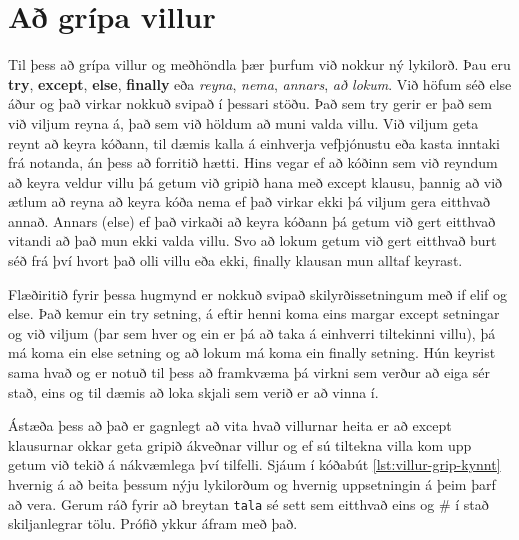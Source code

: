 \section{Að grípa villur}\label{uk:villur-grípa}
Til þess að grípa villur og meðhöndla þær þurfum við nokkur ný lykilorð.
Þau eru \textbf{try}, \textbf{except}, \textbf{else}, \textbf{finally} eða \textit{reyna}, \textit{nema}, \textit{annars}, \textit{að lokum}.
Við höfum séð else áður og það virkar nokkuð svipað í þessari stöðu.
Það sem try gerir er það sem við viljum reyna á, það sem við höldum að muni valda villu.
Við viljum geta reynt að keyra kóðann, til dæmis kalla á einhverja vefþjónustu eða kasta inntaki frá notanda, án þess að forritið hætti.
Hins vegar ef að kóðinn sem við reyndum að keyra veldur villu þá getum við gripið hana með except klausu, þannig að við ætlum að reyna að keyra kóða nema ef það virkar ekki þá viljum gera eitthvað annað.
Annars (else) ef það virkaði að keyra kóðann þá getum við gert eitthvað vitandi að það mun ekki valda villu.
Svo að lokum getum við gert eitthvað burt séð frá því hvort það olli villu eða ekki, finally klausan mun alltaf keyrast.

Flæðiritið fyrir þessa hugmynd er nokkuð svipað skilyrðissetningum með if elif og else.
Það kemur ein try setning, á eftir henni koma eins margar except setningar og við viljum (þar sem hver og ein er þá að taka á einhverri tiltekinni villu), þá má koma ein else setning og að lokum má koma ein finally setning.
Hún keyrist sama hvað og er notuð til þess að framkvæma þá virkni sem verður að eiga sér stað, eins og til dæmis að loka skjali sem verið er að vinna í.

Ástæða þess að það er gagnlegt að vita hvað villurnar heita er að except klausurnar okkar geta gripið ákveðnar villur og ef sú tiltekna villa kom upp getum við tekið á nákvæmlega því tilfelli.
Sjáum í kóðabút \ref{lst:villur-grip-kynnt} hvernig á að beita þessum nýju lykilorðum og hvernig uppsetningin á þeim þarf að vera.
Gerum ráð fyrir að breytan \texttt{tala} sé sett sem eitthvað eins og \# í stað skiljanlegrar tölu.
Prófið ykkur áfram með það. 

